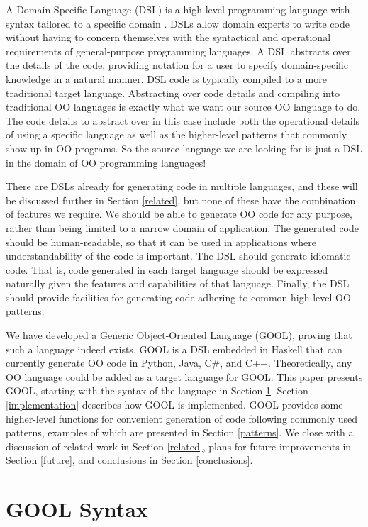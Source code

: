 \documentclass[sigplan,review,anonymous]{acmart}\settopmatter{printfolios=true,printccs=false,printacmref=false}
\begin{document}
A Domain-Specific Language (DSL) is a high-level programming language with 
syntax tailored to a specific domain \cite{mernik2005and}. DSLs allow domain 
experts 
to write code without having to concern themselves with the syntactical and
operational requirements of general-purpose programming languages. A DSL
abstracts over the details of the code, providing notation for a user to
specify domain-specific knowledge in a natural manner. DSL code is typically
compiled to a more traditional target language. Abstracting over code details
and compiling into traditional OO languages is exactly what we want our source
OO language to do. The code details to abstract over in this case include both
the operational details of using a specific language as well as the higher-level
patterns that commonly show up in OO programs. So the source language we are
looking for is just a DSL in the domain of OO programming languages!

There are DSLs already for generating code in multiple languages, and these 
will be discussed further in Section \ref{related}, but none of these have the 
combination of features we require. We should be able to generate OO code for 
any purpose, rather than being limited to a narrow domain of application. The 
generated code should be human-readable, so that it can be used in applications 
where understandability of the code is important. The DSL should generate 
idiomatic code. That is, code generated in each target language should be 
expressed naturally given the features and capabilities of that language. 
Finally, the DSL should provide facilities for generating code adhering to 
common high-level OO patterns. 

We have developed a Generic Object-Oriented Language (GOOL), proving that such 
a language indeed exists. GOOL is a DSL embedded in Haskell that can currently
generate OO code in Python, Java, C\#, and C++. Theoretically, any OO language 
could be added as a target language for GOOL. This paper presents GOOL, 
starting with the syntax of the language in Section \ref{syntax}. Section 
\ref{implementation} describes how GOOL is implemented. GOOL provides some 
higher-level functions for convenient generation of code following commonly 
used patterns, examples of which are presented in Section \ref{patterns}. We 
close with a discussion of related work in Section \ref{related}, plans for 
future improvements in Section \ref{future}, and conclusions in Section 
\ref{conclusions}.

\section{GOOL Syntax} \label{syntax}
\end{document}

